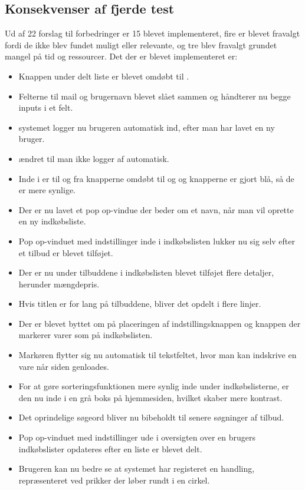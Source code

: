 \subsection{Konsekvenser af fjerde test}
Ud af 22 forslag til forbedringer er 15 blevet implementeret, fire er blevet fravalgt fordi de ikke blev fundet muligt eller relevante, og tre blev fravalgt grundet mangel på tid og ressourcer.\newline
Det der er blevet implementeret er:
\begin{itemize}
\item Knappen  under delt liste er blevet omdøbt til . 
\item Felterne til mail og brugernavn blevet slået sammen og håndterer nu begge inputs i et felt.
\item systemet logger nu brugeren automatisk ind, efter man har lavet en ny bruger.
\item {} ændret til man ikke logger af automatisk.
\item Inde i  er til og fra knapperne omdøbt til  og  og knapperne er gjort blå, så de er mere synlige.
\item Der er nu lavet et pop op-vindue der beder om et navn, når man vil oprette en ny indkøbsliste.
\item Pop op-vinduet med indstillinger inde i indkøbslisten lukker nu sig selv efter et tilbud er blevet tilføjet.
\item Der er nu under tilbuddene i indkøbslisten blevet tilføjet flere detaljer, herunder mængdepris.
\item Hvis titlen er for lang på tilbuddene, bliver det opdelt i flere linjer.
\item Der er blevet byttet om på placeringen af indstillingsknappen og knappen der markerer varer som  på indkøbslisten.
\item Markøren flytter sig nu automatisk til tekstfeltet, hvor man kan indskrive en vare når siden genloades.
\item For at gøre sorteringsfunktionen mere synlig inde under indkøbslisterne, er den nu inde i en grå boks på hjemmesiden, hvilket skaber mere kontrast.
\item Det oprindelige søgeord bliver nu bibeholdt til senere søgninger af tilbud.
\item Pop op-vinduet med indstillinger ude i oversigten over en brugers indkøbslister opdateres efter en liste er blevet delt.
\item Brugeren kan nu bedre se at systemet har registeret en handling, repræsenteret ved prikker der løber rundt i en cirkel.
\end{itemize}
